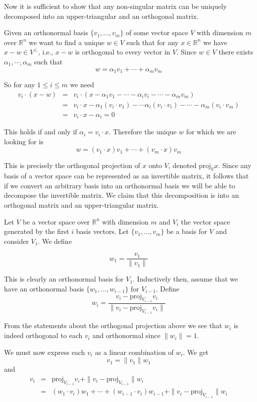 \documentclass[11pt]{article}
\begin{document}
\begin{enumerate}
Now it is sufficient to show that any non-singular matrix can be uniquely decomposed into an upper-triangular and an orthogonal matrix.  

Given an orthonormal basis $\{v_1, \ldots, v_m\}$ of some vector space $V$ with dimension $m$ over $\mathbb{R}^n$ we want to find a unique $w \in V$ such that for any $x \in \mathbb{R}^n$ we have $x - w \in V^{\perp}$, i.e., $x-w$ is orthogonal to every vector in $V$.  Since $w \in V$ there exists $\alpha_1, \cdots, \alpha_m$ such that
\[
w = \alpha_1 v_1 + \cdots + \alpha_m v_m
\]

So for any $1 \leq i \leq m$ we need
\begin{eqnarray*}
v_i \cdot (x - w) &=& v_i \cdot (x - \alpha_1 v_1 - \cdots - \alpha_i v_i - \cdots - \alpha_m v_m) \\
&=& v_i \cdot x - \alpha_1(v_i \cdot v_1) - \cdots \alpha_i (v_i \cdot v_i) - \cdots - \alpha_m (v_i \cdot v_m) \\
&=& v_i \cdot x - \alpha_i = 0 
\end{eqnarray*}

This holds if and only if $\alpha_i = v_i \cdot x$.  Therefore the unique $w$ for which we are looking for is
\[
w = (v_1 \cdot x)v_1 + \cdots + (v_m \cdot x)v_m
\]

This is precisely the orthogonal projection of $x$ onto $V$, denoted $\mbox{proj}_Vx$.  Since any basis of a vector space can be represented as an invertible matrix, it follows that if we convert an arbitrary basis into an orthonormal basis we will be able to decompose the invertible matrix.  We claim that this decomposition is into an orthogonal matrix and an upper-triangular matrix.

Let $V$ be a vector space over $\mathbb{R}^n$ with dimension $m$ and $V_i$ the vector space generated by the first $i$ basis vectors.  Let $\{v_1, \ldots, v_m\}$ be a basis for $V$ and consider $V_1$.  We define

\[
w_1 = \frac{v_1}{\|v_1\|}
\]

This is clearly an orthonormal basis for $V_1$.  Inductively then, assume that we have an orthonormal basis $\{w_1, \ldots, w_{i-1}\}$ for $V_{i-1}$.  Define
\[
w_i = \frac{v_i - \mbox{proj}_{V_{i-1}}v_i}{\|v_i - \mbox{proj}_{V_{i-1}}v_i\|}
\]

From the statements about the orthogonal projection above we see that $w_i$ is indeed orthogonal to each $v_i$ and orthonormal since $\|w_i\| = 1$.

We must now express each $v_i$ as a linear combination of $w_i$.  We get
\[
v_1 = \|v_1\| w_1
\]
and
\begin{eqnarray*}
v_i &=& \mbox{proj}_{V_{i-1}}v_i + \|v_i - \mbox{proj}_{V_{i-1}}\|w_i \\
&=& (w_1 \cdot v_i)w_1 + \cdots + (w_{i-1} \cdot v_i)w_{i-1} + \|v_i - \mbox{proj}_{V_{i-1}}\|w_i
\end{eqnarray*}


\end{enumerate}
\end{document}
